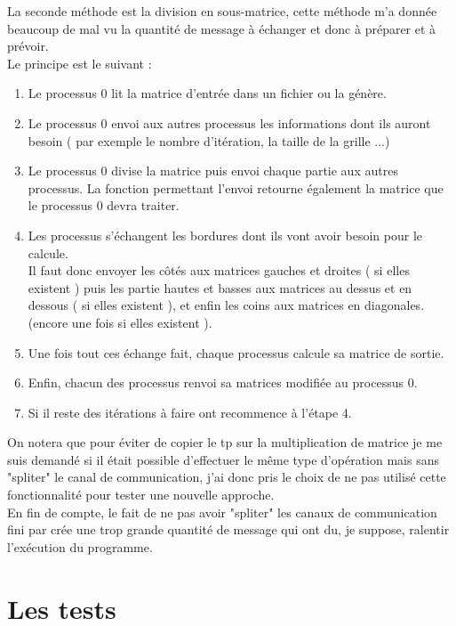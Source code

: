 \documentclass[10pt,a4paper]{article}
\begin{document}
La seconde méthode est la division en sous-matrice, cette méthode m'a donnée beaucoup de mal vu la quantité de message à échanger et donc à préparer et à prévoir. \\
Le principe est le suivant : \\
\begin{enumerate}[(1)]
  \item Le processus 0 lit la matrice d'entrée dans un fichier ou la génère.
  \item Le processus 0 envoi aux autres processus les informations dont ils auront besoin ( par exemple le nombre d'itération, la taille de la grille ...)
  \item Le processus 0 divise la matrice puis envoi chaque partie aux autres processus. La fonction permettant l'envoi retourne également la matrice que le processus 0 devra traiter.
  \item Les processus s'échangent les bordures dont ils vont avoir besoin pour le calcule. \\
  Il faut donc envoyer les côtés aux matrices gauches et droites ( si elles existent ) puis les partie hautes et basses aux matrices au dessus et en dessous ( si elles existent ), et enfin les coins aux matrices en diagonales. (encore une fois si elles existent ).
  \item Une fois tout ces échange fait, chaque processus calcule sa matrice de sortie.
  \item Enfin, chacun des processus renvoi sa matrices modifiée au processus 0.
  \item Si il reste des itérations à faire ont recommence à l'étape 4.

\end{enumerate}
  
On notera que pour éviter de copier le tp sur la multiplication de matrice je me suis demandé si il était possible d'effectuer le même type d'opération mais sans "spliter" le canal de communication, j'ai donc pris le choix de ne pas utilisé cette fonctionnalité pour tester une nouvelle approche. \\
En fin de compte, le fait de ne pas avoir "spliter" les canaux de communication fini par crée une trop grande quantité de message qui ont du, je suppose, ralentir l'exécution du programme.


\section{Les tests}
\end{document}
